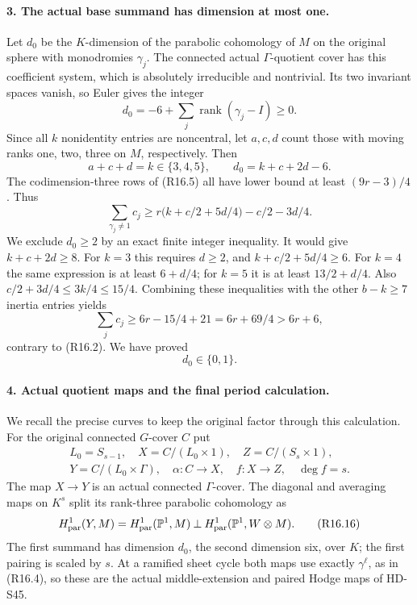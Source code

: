 \paragraph{3. The actual base summand has dimension at most one.}
Let \(d_0\) be the \(K\)-dimension of the parabolic
cohomology of \(M\) on the original sphere with monodromies
\(\gamma_j\). The connected actual \(\Gamma\)-quotient
cover has this coefficient system, which is absolutely
irreducible and nontrivial. Its two invariant spaces vanish,
so Euler gives the integer
\[
 d_0=-6+\sum_j\operatorname{rank}(\gamma_j-I)\ge0.       \tag{R16.10}
\]
Since all \(k\) nonidentity entries are noncentral, let
\(a,c,d\) count those with moving ranks one, two, three
on \(M\), respectively. Then
\[
 a+c+d=k\in\{3,4,5\},\qquad
              d_0=k+c+2d-6.                             \tag{R16.11}
\]
The codimension-three rows of (R16.5) all have lower
bound at least \((9r-3)/4\). Thus
\[
 \sum_{\gamma_j\ne1}c_j
   \ge r\bigl(k+c/2+5d/4\bigr)-c/2-3d/4.              \tag{R16.12}
\]
We exclude \(d_0\ge2\) by an exact finite integer
inequality. It would give \(k+c+2d\ge8\). For \(k=3\)
this requires \(d\ge2\), and
\(k+c/2+5d/4\ge6\). For \(k=4\) the same expression
is at least \(6+d/4\); for \(k=5\) it is at least
\(13/2+d/4\). Also
\(c/2+3d/4\le3k/4\le15/4\). Combining these inequalities
with the other \(b-k\ge7\) inertia entries yields
\[
 \sum_jc_j\ge6r-15/4+21
                       =6r+69/4>6r+6,                   \tag{R16.13}
\]
contrary to (R16.2). We have proved
\[
                              d_0\in\{0,1\}.            \tag{R16.14}
\]

\paragraph{4. Actual quotient maps and the final period calculation.}
We recall the precise curves to keep the original factor
through this calculation. For the original connected
\(G\)-cover \(C\) put
\[
 \begin{gathered}
 L_0=S_{s-1},\quad X=C/(L_0\times1),\quad Z=C/(S_s\times1),\\
 Y=C/(L_0\times\Gamma),\quad
 \alpha:C\to X,\quad f:X\to Z,\quad\deg f=s.
 \end{gathered}                                           \tag{R16.15}
\]
The map \(X\to Y\) is an actual connected
\(\Gamma\)-cover. The diagonal and averaging maps on
\(K^s\) split its rank-three parabolic cohomology as
\[
 H^1_{\rm par}(Y,M)
   =H^1_{\rm par}(\mathbb P^1,M)
        \mathbin{\perp}H^1_{\rm par}(\mathbb P^1,W\otimes M).
                                                               \tag{R16.16}
\]
The first summand has dimension \(d_0\), the second
dimension six, over \(K\); the first pairing is scaled
by \(s\). At a ramified sheet cycle both maps use exactly
\(\gamma^\ell\), as in (R16.4), so these are the
actual middle-extension and paired Hodge maps of HD-S45.

